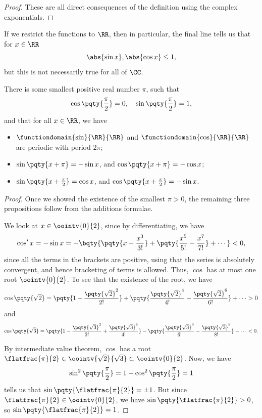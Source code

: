 \begin{proof}
    These are all direct consequences of the definition using the complex exponentials.
\end{proof}

\begin{remark}
    If we restrict the functions to \(\RR\), then in particular, the final line tells us that for \(x \in \RR\)
    \[
        \abs{\sin x}, \abs{\cos x} \leq 1,
    \]
    but this is not necessarily true for all of \(\CC\).
\end{remark}

\begin{proposition}
    \label{prop:periodicity-trigonometric-functions}%
    There is some smallest positive real number \(\pi\), such that
    \[
        \cos \pqty{\frac{\pi}{2}} = 0, \quad \sin \pqty{\frac{\pi}{2}} = 1,
    \]
    and that for all \(x \in \RR\), we have
    \begin{itemize}
        \item \(\functiondomain{\sin}{\RR}{\RR}\) and \(\functiondomain{\cos}{\RR}{\RR}\) are periodic with period \(2 \pi\);
        \item \(\sin \pqty{x + \pi} = - \sin x\), and \(\cos \pqty{x + \pi} = - \cos x\);
        \item \(\sin \pqty{x + \frac{\pi}{2}} = \cos x\), and \(\cos \pqty{x + \frac{\pi}{2}} = - \sin x\).
    \end{itemize}
\end{proposition}

\begin{proof}
    Once we showed the existence of the smallest \(\pi > 0\), the remaining three propositions follow from the additions formulae.

    We look at \(x \in \oointv{0}{2}\), since by differentiating, we have
    \[
        \cos' x = - \sin x = - \bqty{\pqty{x - \frac{x^3}{3!}} + \pqty{\frac{x^5}{5!} - \frac{x^7}{7!}} + \cdots} < 0,
    \]
    since all the terms in the brackets are positive, using that the series is absolutely convergent, and hence bracketing of terms is allowed. Thus, \(\cos\) has at most one root \(\oointv{0}{2}\). To see that the existence of the root, we have
    \[
        \cos \pqty{\sqrt{2}} = \pqty{1 - \frac{\pqty{\sqrt{2}}^2}{2!}} + \pqty{\frac{\pqty{\sqrt{2}}^4}{4!} - \frac{\pqty{\sqrt{2}}^6}{6!}} + \cdots > 0
    \]
    and
    \[
        \cos \pqty{\sqrt{3}} = \pqty{1 - \frac{\pqty{\sqrt{3}}^2}{2!} + \frac{\pqty{\sqrt{3}}^4}{4!}} - \pqty{\frac{\pqty{\sqrt{3}}^6}{6!} - \frac{\pqty{\sqrt{3}}^8}{8!}} - \cdots < 0.
    \]
    
    By intermediate value theorem, \(\cos\) has a root \(\flatfrac{\pi}{2} \in \oointv{\sqrt{2}}{\sqrt{3}} \subset \oointv{0}{2}\). Now, we have
    \[
        \sin^2\pqty{\frac{\pi}{2}} = 1 - \cos^2 \pqty{\frac{\pi}{2}} = 1
    \]
    tells us that \(\sin \pqty{\flatfrac{\pi}{2}} = \pm 1\). But since \(\flatfrac{\pi}{2} \in \oointv{0}{2}\), we have \(\sin \pqty{\flatfrac{\pi}{2}} > 0\), so \(\sin \pqty{\flatfrac{\pi}{2}} = 1\).
\end{proof}

